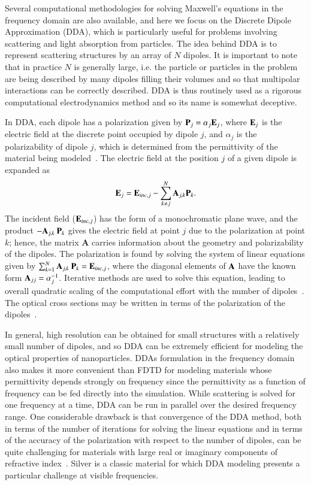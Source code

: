 \documentclass[review]{elsarticle}
\begin{document}
Several computational methodologies for solving Maxwell's equations in the frequency domain are also available, and here we focus on the Discrete
Dipole Approximation (DDA), which is particularly useful for problems involving scattering and light absorption from
particles.  The idea behind DDA is to represent scattering structures by an array of $N$ dipoles.  
It is important to note that in practice $N$ is generally large, i.e. the particle or particles
in the problem are being described by many dipoles filling their volumes 
and so that multipolar
interactions can be correctly described.  DDA is thus routinely used as a rigorous 
computational electrodynamics
method and so its name is somewhat deceptive.

In DDA, each dipole has a polarization given by 
${\bf P}_j = \alpha_j {\bf E}_j$, where ${\bf E}_j$ is the electric field 
at the discrete point occupied by dipole $j$, and $\alpha_j$ is the polarizability of dipole $j$, which 
is determined from the permittivity of the material being modeled~\cite{DF_JOptSocA_1994}.  The electric field at the position $j$ of a given dipole is expanded as
\begin{equation}
{\bf E}_j = {\bf E}_{inc,j} - \sum_{k \neq j}^N {\bf A}_{j,k} {\bf P}_k.
\end{equation}
The incident field (${\bf E}_{inc,j}$) has the form of a monochromatic plane wave, and the product
$-{\bf A}_{j,k} \: {\bf P}_k$ gives the electric field at point $j$ due to the polarization at point $k$; hence, the matrix {\bf A} carries information about
the geometry and polarizability of the dipoles.   
The polarization is found by solving the system of linear equations given by
$\sum_{k=1}^N {\bf A}_{j,k} \: {\bf P}_k = {\bf E}_{inc,j}$, where the diagonal elements of ${\bf A}$ have the known form
${\bf A}_{jj} = \alpha_j^{-1}$.
Iterative methods are used to solve this equation,
leading to overall quadratic scaling of
the computational effort with the number of dipoles~\cite{DF_JOptSocA_1994}. 
The optical cross
sections may be written 
in terms of the polarization of the dipoles~\cite{DF_JOptSocA_1994}.

In general, high resolution can be obtained for small structures with a relatively small number of
dipoles, and so DDA can be extremely efficient for modeling the optical properties of nanoparticles.  DDAs formulation in the frequency domain also
makes it more convenient than FDTD for modeling materials whose permittivity depends strongly on frequency since the permittivity as a function of
frequency can be fed directly into the simulation.  While scattering is solved for one frequency at a time, DDA can be run in parallel over the
desired frequency range.  One considerable drawback is that convergence of the DDA method, both in terms of the number of iterations for
solving the linear equations and in terms of the accuracy of the polarization with respect to the number of dipoles, can be quite
challenging for materials with large real or imaginary components of refractive index~\cite{YMH_PRE_2010}.  Silver is a classic material for which DDA modeling presents a particular challenge at visible frequencies.
\end{document}
